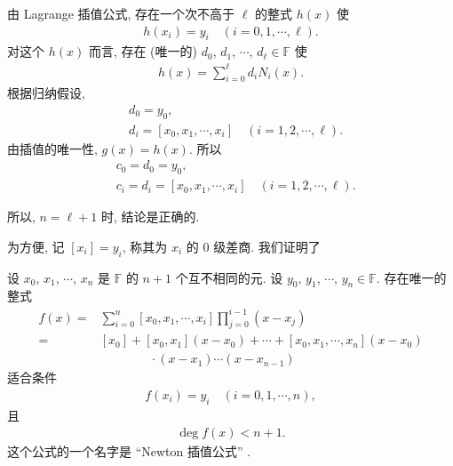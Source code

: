\begin{pf}
    由 Lagrange 插值公式, 存在一个次不高于 $\ell$ 的整式 $h(x)$ 使
    \begin{align*}
        h(x_i) = y_i \quad (i = 0,1,\cdots,\ell).
    \end{align*}
    对这个 $h(x)$ 而言, 存在 (唯一的) $d_0$, $d_1$, $\cdots$, $d_{\ell} \in \mathbb{F}$ 使
    \begin{align*}
        h(x) = \sum_{i = 0}^{\ell} d_i N_{i} (x).
    \end{align*}
    根据归纳假设,
    \begin{align*}
         & d_0 = y_0,                                                 \\
         & d_i = [x_0, x_1, \cdots, x_i] \quad (i = 1,2,\cdots,\ell).
    \end{align*}
    由插值的唯一性, $g(x) = h(x)$. 所以
    \begin{align*}
         & c_0 = d_0 = y_0,                                                 \\
         & c_i = d_i = [x_0, x_1, \cdots, x_i] \quad (i = 1,2,\cdots,\ell).
    \end{align*}

    所以, $n = \ell + 1$ 时, 结论是正确的.
\end{pf}

为方便, 记 $[x_i] = y_i$, 称其为 $x_i$ 的 $0$ 级差商. 我们证明了

\begin{proposition}
    设 $x_0$, $x_1$, $\cdots$, $x_{n}$ 是 $\mathbb{F}$ 的 $n+1$ 个互不相同的元. 设 $y_0$, $y_1$, $\cdots$, $y_{n} \in \mathbb{F}$. 存在唯一的整式
    \begin{align*}
        f(x)
        = {} & \sum_{i = 0}^{n} [x_0, x_1, \cdots, x_i]
        \prod_{j = 0}^{i - 1} (x - x_j)                                                \\
        = {} & [x_0] + [x_0, x_1] (x - x_0) + \cdots + [x_0, x_1, \cdots, x_n] (x-x_0) \\
             & \qquad \qquad \cdot (x-x_1)\cdots (x-x_{n-1})
    \end{align*}
    适合条件
    \begin{align*}
        f(x_i) = y_i \quad (i = 0,1,\cdots,n),
    \end{align*}
    且
    \begin{align*}
        \deg f(x) < n + 1.
    \end{align*}
    这个公式的一个名字是 ``Newton 插值公式'' .
\end{proposition}

